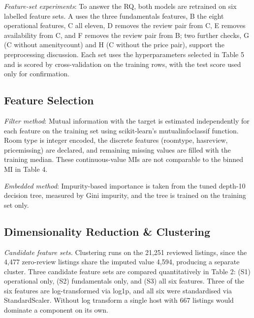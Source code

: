 \documentclass[final,1p,11pt]{elsarticle}
\renewcommand\_{\textunderscore\allowbreak}%
\begin{document}
\textit{Feature-set experiments}: To answer the RQ, both models are retrained on six labelled feature sets. A uses the three fundamentals features, B the eight operational features, C all eleven, D removes the review pair from C, E removes availability\_365 from C, and F removes the review pair from B; two further checks, G (C without amenity\_count) and H (C without the price pair), support the preprocessing discussion. Each set uses the hyperparameters selected in Table 5 and is scored by cross-validation on the training rows, with the test score used only for confirmation.

\subsection{Feature Selection}

\textit{Filter method}: Mutual information with the target is estimated independently for each feature on the training set using scikit-learn’s mutual\_info\_classif function. Room type is integer encoded, the discrete features (room\_type\_3, has\_review, price\_missing) are declared, and remaining missing values are filled with the training median. These continuous-value MIs are not comparable to the binned MI in Table 4.

\textit{Embedded method}: Impurity-based importance is taken from the tuned depth-10 decision tree, measured by Gini impurity, and the tree is trained on the training set only.

\subsection{Dimensionality Reduction \& Clustering}

\textit{Candidate feature sets.} Clustering runs on the 21,251 reviewed listings, since the 4,477 zero-review listings share the imputed value 4,594, producing a separate cluster. Three candidate feature sets are compared quantitatively in Table 2: (S1) operational only, (S2) fundamentals only, and (S3) all six features. Three of the six features are log-transformed via log1p, and all six were standardised via StandardScaler. Without log transform a single host with 667 listings would dominate a component on its own.
\end{document}

